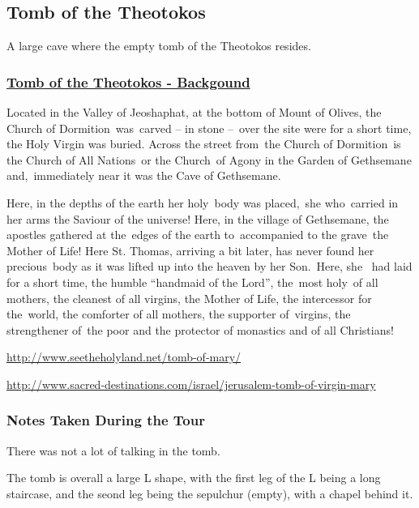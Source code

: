 \documentclass[letterpaper]{report}
\begin{document}
\subsection{Tomb of the Theotokos}
A large cave where the empty tomb of the Theotokos resides.
\begin{multicols}{2}

\subsubsection{
\href{https://orthodoxword.wordpress.com/2010/08/15/the-tomb-of-the-most-holy-virgin-jerusalem}{
Tomb of the Theotokos - Backgound}}

Located in the Valley of Jeoshaphat, at the bottom of Mount of Olives, the Church of Dormition was carved – in stone – over the site were for a short time, the Holy Virgin was buried. Across the street from the Church of Dormition is the Church of All Nations or the Church of Agony in the Garden of Gethsemane and, immediately near it was the Cave of Gethsemane.

Here, in the depths of the earth her holy body was placed, she who carried in her arms the Saviour of the universe! Here, in the village of Gethsemane, the apostles gathered at the edges of the earth to accompanied to the grave the Mother of Life! Here St. Thomas, arriving a bit later, has never found her precious body as it was lifted up into the heaven by her Son. Here, she  had laid for a short time, the humble “handmaid of the Lord”, the most holy of all mothers, the cleanest of all virgins, the Mother of Life, the intercessor for the world, the comforter of all mothers, the supporter of virgins, the strengthener of the poor and the protector of monastics and of all Christians!

\url{http://www.seetheholyland.net/tomb-of-mary/}

\url{http://www.sacred-destinations.com/israel/jerusalem-tomb-of-virgin-mary}

\subsubsection{Notes Taken During the Tour}	
There was not a lot of talking in the tomb.

The tomb is overall a large L shape, with the first leg of the L being a long staircase, and the seond leg being the
sepulchur (empty), with a chapel behind it.

\end{multicols}
\end{document}
